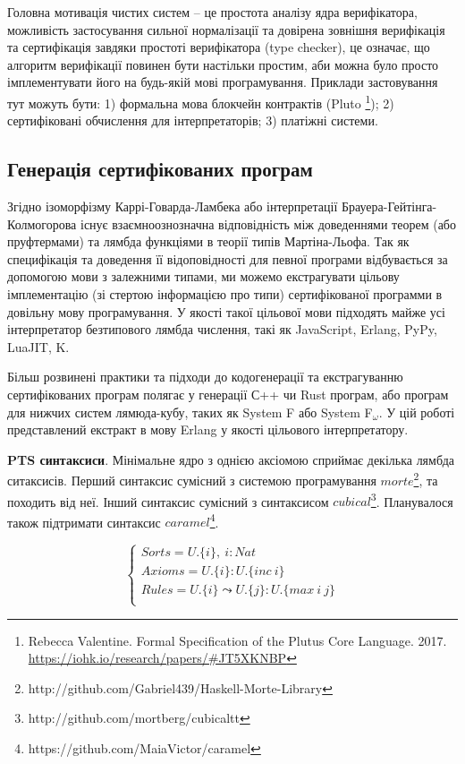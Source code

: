 Головна мотивація чистих систем -- це простота аналізу ядра верифікатора,
можливість застосування сильної нормалізації та довірена зовнішня верифікація
та сертифікація завдяки простоті верифікатора (type checker), це означає, що
алгоритм верифікації повинен бути настільки простим, аби можна було
просто імплементувати його на будь-якій мові програмування. Приклади застовування
тут можуть бути:
1) формальна мова блокчейн контрактів (Pluto
   \footnote{Rebecca Valentine. Formal Specification of the Plutus Core Language. 2017.
             \url{https://iohk.io/research/papers/#JT5XKNBP}});
2) сертифіковані обчислення для інтерпретаторів;
3) платіжні системи.

\subsection{Генерація сертифікованих програм}
Згідно ізоморфізму Каррі-Говарда-Ламбека або інтерпретації Брауера-Гейтінга-Колмогорова
існує взаємноознозначна відповідність між доведеннями теорем (або пруфтермами)
та лямбда функціями в теорії типів Мартіна-Льофа\cite{Lof84}.
Так як специфікація та доведення її відоповідності для певної програми
відбувається за допомогою мови з залежними типами, ми можемо екстрагувати
цільову імплементацію (зі стертою інформацією про типи) сертифікованої программи
в довільну мову програмування. У якості такої цільової мови підходять
майже усі інтерпретатор безтипового лямбда числення, такі як JavaScript,
Erlang, PyPy, LuaJIT, K.

Більш розвинені практики та підходи до кодогенерації та екстрагуванню
сертифікованих програм полягає у генерації С++ чи Rust програм, або програм
для нижчих систем лямюда-кубу, таких як System F або System F$_\omega$.
У цій роботі представлений екстракт в мову Erlang у якості цільового інтерпретатору.

\textbf{PTS синтаксиси}. Мінімальне ядро з однією аксіомою
сприймає декілька лямбда ситаксисів.
Перший синтаксис сумісний з системою програмування
$morte$\footnote{http://github.com/Gabriel439/Haskell-Morte-Library}, та походить від неї.
Інший синтаксис сумісний з синтаксисом $cubical$\footnote{http://github.com/mortberg/cubicaltt}.
Планувалося також підтримати синтаксис $caramel$\footnote{https://github.com/MaiaVictor/caramel}.

\begin{equation}
\begin{cases}
Sorts = U.\{i\},\ i : Nat\\
Axioms = U.\{i\} : U.\{inc\ i\}\\
Rules = U.\{i\} \leadsto U.\{j\} : U.\{max\ i\ j\}\\
\end{cases}
\end{equation}

